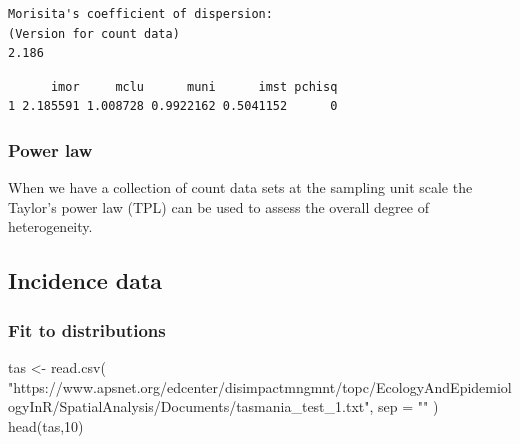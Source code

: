 \documentclass[
  letterpaper,
]{book}
\newenvironment{Shaded}{\begin{snugshade}}{\end{snugshade}}
\newcommand{\AttributeTok}[1]{\textcolor[rgb]{0.40,0.45,0.13}{#1}}
\newcommand{\CommentTok}[1]{\textcolor[rgb]{0.37,0.37,0.37}{#1}}
\newcommand{\DecValTok}[1]{\textcolor[rgb]{0.68,0.00,0.00}{#1}}
\newcommand{\FunctionTok}[1]{\textcolor[rgb]{0.28,0.35,0.67}{#1}}
\newcommand{\NormalTok}[1]{\textcolor[rgb]{0.00,0.23,0.31}{#1}}
\newcommand{\OtherTok}[1]{\textcolor[rgb]{0.00,0.23,0.31}{#1}}
\newcommand{\SpecialCharTok}[1]{\textcolor[rgb]{0.37,0.37,0.37}{#1}}
\newcommand{\StringTok}[1]{\textcolor[rgb]{0.13,0.47,0.30}{#1}}
\begin{document}
\begin{verbatim}
Morisita's coefficient of dispersion:
(Version for count data)
2.186
\end{verbatim}

\begin{Shaded}
\end{Shaded}

\begin{verbatim}
      imor     mclu      muni      imst pchisq
1 2.185591 1.008728 0.9922162 0.5041152      0
\end{verbatim}

\hypertarget{power-law}{%
\subsubsection{Power law}\label{power-law}}

When we have a collection of count data sets at the sampling unit scale
the Taylor's power law (TPL) can be used to assess the overall degree of
heterogeneity.

\hypertarget{incidence-data-1}{%
\subsection{Incidence data}\label{incidence-data-1}}

\hypertarget{fit-to-distributions-1}{%
\subsubsection{Fit to distributions}\label{fit-to-distributions-1}}

\begin{Shaded}
\begin{Highlighting}[]
\NormalTok{tas }\OtherTok{\textless{}{-}}
  \FunctionTok{read.csv}\NormalTok{(}
    \StringTok{"https://www.apsnet.org/edcenter/disimpactmngmnt/topc/EcologyAndEpidemiologyInR/SpatialAnalysis/Documents/tasmania\_test\_1.txt"}\NormalTok{,}
    \AttributeTok{sep =} \StringTok{""}
\NormalTok{  )}
\FunctionTok{head}\NormalTok{(tas,}\DecValTok{10}\NormalTok{)}
\end{Highlighting}
\end{Shaded}
\end{document}
